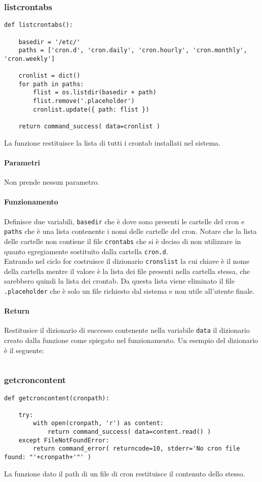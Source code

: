 \documentclass[11pt]{article}
\begin{document}
\subsubsection{listcrontabs}
\begin{lstlisting}
def listcrontabs():

    basedir = '/etc/'
    paths = ['cron.d', 'cron.daily', 'cron.hourly', 'cron.monthly', 'cron.weekly']

    cronlist = dict()
    for path in paths:
        flist = os.listdir(basedir + path)
        flist.remove('.placeholder') 
        cronlist.update({ path: flist })

    return command_success( data=cronlist )
\end{lstlisting}
La funzione restituisce la lista di tutti i crontab installati nel sistema.
\paragraph{Parametri}
Non prende nessun parametro.
\paragraph{Funzionamento}
Definisce due variabili, \texttt{basedir} che è dove sono presenti le cartelle del cron e \texttt{paths} che è
una lista contenente i nomi delle cartelle del cron. Notare che la lista delle cartelle non contiene il file
\texttt{crontabs} che si è deciso di non utilizzare in quanto egregiamente sostituito dalla cartella \texttt{cron.d}.\\
Entrando nel ciclo for costruisce il dizionario \texttt{cronslist} la cui chiave è il nome della cartella mentre
il valore è la lista dei file presenti nella cartella stessa, che sarebbero quindi la lista dei crontab.
Da questa lista viene eliminato il file \texttt{.placeholder} che è solo un file richiesto dal sistema e non
utile all'utente finale.
\paragraph{Return}
Restitusice il dizionario di successo contenente nella variabile \texttt{data} il dizionario creato dalla funzione
come spiegato nel funzionamento. Un esempio del dizionario è il seguente:
\begin{lstlisting}
\end{lstlisting}

\subsubsection{getcroncontent}\label{getcroncontent}
\begin{lstlisting}
def getcroncontent(cronpath):

    try:
        with open(cronpath, 'r') as content:
            return command_success( data=content.read() )
    except FileNotFoundError:
        return command_error( returncode=10, stderr='No cron file found: "'+cronpath+'"' )
\end{lstlisting}
La funzione dato il path di un file di cron restituisce il contenuto dello stesso.
\end{document}
